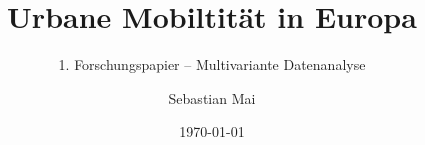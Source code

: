 \documentclass[a4paper,12pt,titlepage]{scrartcl}
\title{Urbane Mobiltität in Europa}
\subtitle{1. Forschungspapier – Multivariante Datenanalyse}
\author{Sebastian Mai}
\date{\today} %
\begin{document}
\maketitle
\tableofcontents
\listoftables



\newpage
\sloppy
\printbibliography
\end{document}
